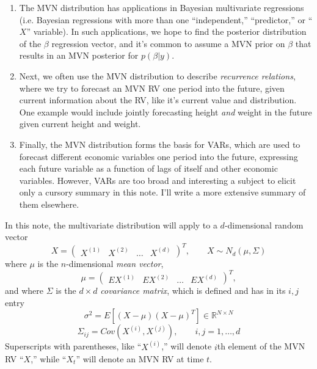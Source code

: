 \documentclass[12pt]{article}
\theoremstyle{plain}
\theoremstyle{definition}
\theoremstyle{remark}
\begin{document}
\begin{enumerate}
  \item The MVN distribution has applications in Bayesian multivariate
    regressions (i.e. Bayesian regressions with more than one
    ``independent,'' ``predictor,'' or ``$X$'' variable).  In such
    applications, we hope to find the posterior distribution of the
    $\beta$ regression vector, and it's common to assume a MVN prior on
    $\beta$ that results in an MVN posterior for $p(\beta|y)$.

  \item Next, we often use the MVN distribution to describe
    \emph{recurrence relations}, where we try to forecast an MVN RV one
    period into the future, given current information about the RV, like
    it's current value and distribution. One example would include
    jointly forecasting height \emph{and} weight in the future given
    current height and weight.

  \item Finally, the MVN distribution forms the basis for VARs, which
    are used to forecast different economic variables one period into
    the future, expressing each future variable as a function of lags of
    itself and other economic variables.  However, VARs are too broad
    and interesting a subject to elicit only a cursory summary in this
    note.  I'll write a more extensive summary of them elsewhere.
\end{enumerate}

In this note, the multivariate distribution will apply to a
$d$-dimensional random vector
\[ X = \begin{pmatrix} X^{(1)} & X^{(2)} & \ldots & X^{(d)} \end{pmatrix}^T,
    \qquad X  \sim N_d(\mu, \Sigma) \]
where $\mu$ is the $n$-dimensional \emph{mean vector},
\[ \mu = \begin{pmatrix} EX^{(1)} & EX^{(2)} & \ldots & EX^{(d)} \end{pmatrix}^T,
      \]
and where $\Sigma$ is the $d\times d$ \emph{covariance matrix}, which
is defined and has in its $i,j$ entry
\[ \sigma^2 = E\left[ (X - \mu) (X-\mu)^T\right] \in
   \mathbb{R}^{N\times N} \]
\[ \Sigma_{ij} = Cov(X^{(i)}, X^{(j)}), \qquad i,j = 1, \ldots, d\]
Superscripts with parentheses, like ``$X^{(i)}$,'' will denote
$i$th element of the MVN RV ``$X$,'' while ``$X_t$'' will denote
an MVN RV at time $t$.
\end{document}
